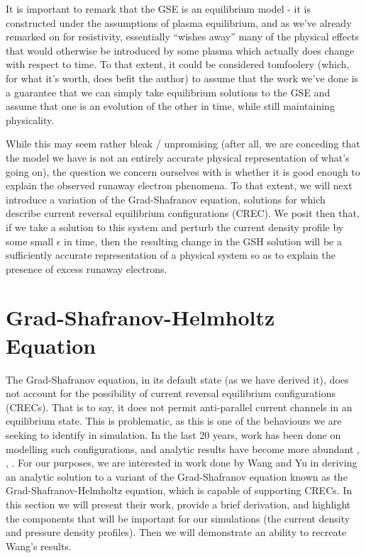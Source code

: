 It is important to remark that the GSE is an equilibrium model - it is constructed under the assumptions of plasma equilibrium, and as we've 
already remarked on for resistivity, essentially ``wishes away'' many of the physical effects that would otherwise be introduced by some plasma which actually does 
change with respect to time. To that extent, 
it could be considered tomfoolery (which, for what it's worth, does befit the author) to assume that the work we've done is a guarantee that 
we can simply take equilibrium solutions to the GSE and assume that one is an evolution of the other in time, while still maintaining physicality.

While this may seem rather bleak / unpromising (after all, we are conceding that the model we have is not an entirely accurate 
physical representation of what's going on), the question we concern ourselves with is whether it is good enough to explain 
the observed runaway electron phenomena. To that extent, we will next introduce a variation of the Grad-Shafranov equation, 
solutions for which describe current reversal equilibrium configurations (CREC). We posit then that, if we take a 
solution to this system and perturb the current density profile by some small $\epsilon$ in time, then the resulting 
change in the GSH solution will be a sufficiently accurate representation of a physical system so as to explain the 
presence of excess runaway electrons.

\section{Grad-Shafranov-Helmholtz Equation}

The Grad-Shafranov equation, in its default state (as we have derived it), does not account for the possibility of current 
reversal equilibrium configurations (CRECs). That is to say, it does not permit anti-parallel current channels in an equilibrium state. 
This is problematic, as this is one of the behaviours we are seeking to identify in simulation. In the last 20 years, work has been done on 
modelling such configurations, and analytic results have become more abundant \cite{wang-analytic-solution}, \cite{crec-work-1}, \cite{crec-work-2}.
For our purposes, we are interested in work done by Wang and Yu in deriving an analytic solution to a variant of the Grad-Shafranov equation 
known as the Grad-Shafranov-Helmholtz equation, which is capable of supporting CRECs. In this section we will present their work, provide a 
brief derivation, and highlight the components that will be important for our simulations (the current density and pressure density profiles). 
Then we will demonstrate an ability to recreate Wang's results.

